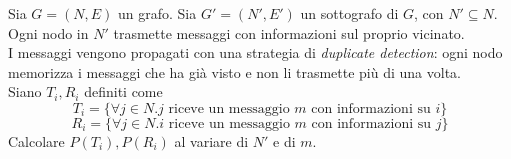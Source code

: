 \documentclass[a4paper]{report}
\begin{document}
Sia $G=(N,E)$ un grafo. Sia $G'=(N',E')$ un sottografo di $G$,
con $N' \subseteq N$.\\
Ogni nodo in $N'$ trasmette messaggi con informazioni sul proprio vicinato.\\
I messaggi vengono propagati con una strategia di {\em duplicate detection}:
ogni nodo memorizza i messaggi che ha già visto e non li trasmette più di una volta.\\
Siano $T_i, R_i$ definiti come
\begin{equation}
  T_i=\{ \forall j \in N.j \text{ riceve un messaggio }m\text{ con informazioni su }i \}
\end{equation}
\begin{equation}
R_i=\lbrace \forall j \in N.i\text{ riceve un messaggio }m\text{ con informazioni su }j \rbrace
\end{equation}
Calcolare $P(T_i), P(R_i)$ al variare di $N'$ e di $m$.
\end{document}
